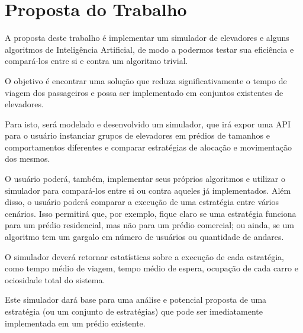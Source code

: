 \chapter{\label{chap:proposal}Proposta do Trabalho}

A proposta deste trabalho é implementar um simulador de elevadores e alguns
algoritmos de Inteligência Artificial, de modo a podermos testar sua eficiência
e compará-los entre si e contra um algoritmo trivial.

O objetivo é encontrar uma solução que reduza significativamente o tempo de
viagem dos passageiros e possa ser implementado em conjuntos existentes de
elevadores.

Para isto, será modelado e desenvolvido um simulador, que irá expor uma API para
o usuário instanciar grupos de elevadores em prédios de tamanhos e
comportamentos diferentes e comparar estratégias de alocação e movimentação dos
mesmos.

O usuário poderá, também, implementar seus próprios algoritmos e utilizar o
simulador para compará-los entre si ou contra aqueles já implementados. Além
disso, o usuário poderá comparar a execução de uma estratégia entre vários
cenários. Isso permitirá que, por exemplo, fique claro se uma estratégia
funciona para um prédio residencial, mas não para um prédio comercial; ou ainda,
se um algoritmo tem um gargalo em número de usuários ou quantidade de andares.

O simulador deverá retornar estatísticas sobre a execução de cada estratégia,
como tempo médio de viagem, tempo médio de espera, ocupação de cada carro e
ociosidade total do sistema.

Este simulador dará base para uma análise e potencial proposta de uma estratégia
(ou um conjunto de estratégias) que pode ser imediatamente implementada em um
prédio existente.